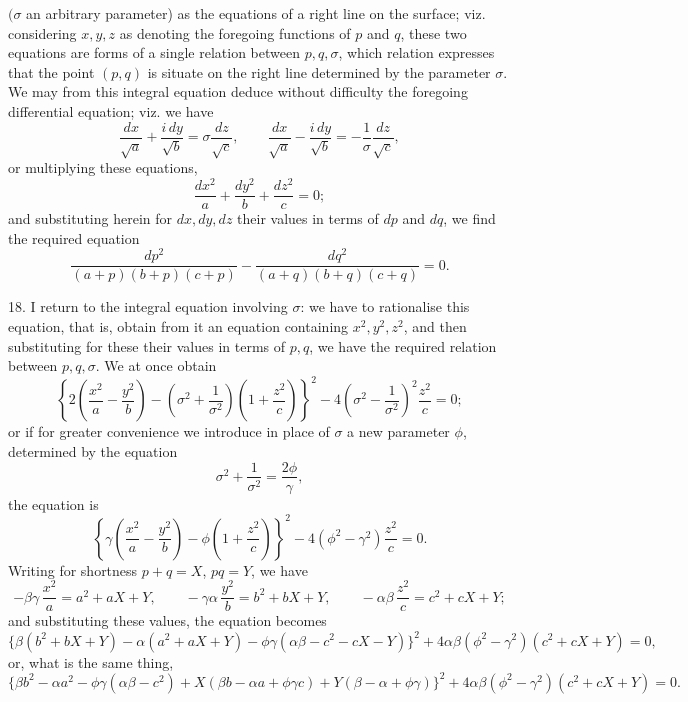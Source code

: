 \documentclass[11pt,a4paper]{article}
\newcommand{\paperid}[1]{\par\medskip\noindent{\bfseries [#1]}\quad}
\begin{document}
\paperid{508}
$(\sigma$ an arbitrary parameter) as the equations of a right line on the surface; viz.
considering $x,y,z$ as denoting the foregoing functions of $p$ and $q$, these two equations
are forms of a single relation between $p,q,\sigma$, which relation expresses that the point
$(p,q)$ is situate on the right line determined by the parameter $\sigma$. We may from
this integral equation deduce without difficulty the foregoing differential equation; viz.
we have
\[
 \frac{dx}{\sqrt a}+\frac{i\,dy}{\sqrt b}=\sigma\frac{dz}{\sqrt c},
 \qquad
 \frac{dx}{\sqrt a}-\frac{i\,dy}{\sqrt b}=-\frac{1}{\sigma}\frac{dz}{\sqrt c},
\]
or multiplying these equations,
\[
 \frac{dx^2}{a}+\frac{dy^2}{b}+\frac{dz^2}{c}=0;
\]
and substituting herein for $dx,dy,dz$ their values in terms of $dp$ and $dq$, we find
the required equation
\[
 \frac{dp^2}{(a+p)(b+p)(c+p)}
 -\frac{dq^2}{(a+q)(b+q)(c+q)}=0.
\]

18. I return to the integral equation involving $\sigma$: we have to rationalise this
equation, that is, obtain from it an equation containing $x^2,y^2,z^2$, and then substituting
for these their values in terms of $p,q$, we have the required relation between $p,q,\sigma$.
We at once obtain
\[
 \left\{2\left(\frac{x^2}{a}-\frac{y^2}{b}\right)
 -\left(\sigma^2+\frac{1}{\sigma^2}\right)\left(1+\frac{z^2}{c}\right)\right\}^2
 -4\left(\sigma^2-\frac{1}{\sigma^2}\right)^2\frac{z^2}{c}=0;
\]
or if for greater convenience we introduce in place of $\sigma$ a new parameter $\phi$,
determined by the equation
\[
 \sigma^2+\frac{1}{\sigma^2}=\frac{2\phi}{\gamma},
\]
the equation is
\[
 \left\{\gamma\left(\frac{x^2}{a}-\frac{y^2}{b}\right)
 -\phi\left(1+\frac{z^2}{c}\right)\right\}^2
 -4(\phi^2-\gamma^2)\frac{z^2}{c}=0.
\]
Writing for shortness $p+q=X$, $pq=Y$, we have
\[
 -\beta\gamma\,\frac{x^2}{a}=a^2+aX+Y,\qquad
 -\gamma\alpha\,\frac{y^2}{b}=b^2+bX+Y,\qquad
 -\alpha\beta\,\frac{z^2}{c}=c^2+cX+Y;
\]
and substituting these values, the equation becomes
\[
 \{\beta(b^2+bX+Y)-\alpha(a^2+aX+Y)-\phi\gamma(\alpha\beta-c^2-cX-Y)\}^2
 +4\alpha\beta(\phi^2-\gamma^2)(c^2+cX+Y)=0,
\]
or, what is the same thing,
\[
 \{\beta b^2-\alpha a^2-\phi\gamma(\alpha\beta-c^2)
 +X(\beta b-\alpha a+\phi\gamma c)+Y(\beta-\alpha+\phi\gamma)\}^2
 +4\alpha\beta(\phi^2-\gamma^2)(c^2+cX+Y)=0.
\]
\end{document}
